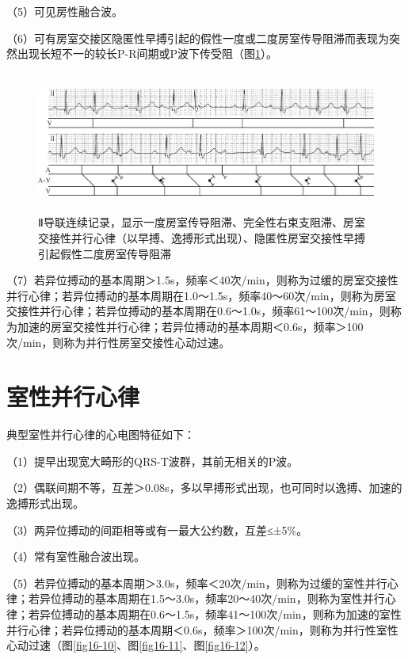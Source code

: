 （5）可见房性融合波。

（6）可有房室交接区隐匿性早搏引起的假性一度或二度房室传导阻滞而表现为突然出现长短不一的较长P-R间期或P波下传受阻（图\ref{fig16-9}）。

\begin{figure}[!htbp]
 \centering
 \includegraphics[width=5.75in,height=1.82292in]{./images/Image00285.jpg}
 \captionsetup{justification=centering}
 \caption{Ⅱ导联连续记录，显示一度房室传导阻滞、完全性右束支阻滞、房室交接性并行心律（以早搏、逸搏形式出现）、隐匿性房室交接性早搏引起假性二度房室传导阻滞}
 \label{fig16-9}
  \end{figure} 

（7）若异位搏动的基本周期＞1.5s，频率＜40次/min，则称为过缓的房室交接性并行心律；若异位搏动的基本周期在1.0～1.5s，频率40～60次/min，则称为房室交接性并行心律；若异位搏动的基本周期在0.6～1.0s，频率61～100次/min，则称为加速的房室交接性并行心律；若异位搏动的基本周期＜0.6s，频率＞100次/min，则称为并行性房室交接性心动过速。

\protect\hypertarget{text00023.htmlux5cux23subid287}{}{}

\section{室性并行心律}

典型室性并行心律的心电图特征如下：

（1）提早出现宽大畸形的QRS-T波群，其前无相关的P波。

（2）偶联间期不等，互差＞0.08s，多以早搏形式出现，也可同时以逸搏、加速的逸搏形式出现。

（3）两异位搏动的间距相等或有一最大公约数，互差≤±5\%。

（4）常有室性融合波出现。

（5）若异位搏动的基本周期＞3.0s，频率＜20次/min，则称为过缓的室性并行心律；若异位搏动的基本周期在1.5～3.0s，频率20～40次/min，则称为室性并行心律；若异位搏动的基本周期在0.6～1.5s，频率41～100次/min，则称为加速的室性并行心律；若异位搏动的基本周期＜0.6s，频率＞100次/min，则称为并行性室性心动过速（图\ref{fig16-10}、图\ref{fig16-11}、图\ref{fig16-12}）。

